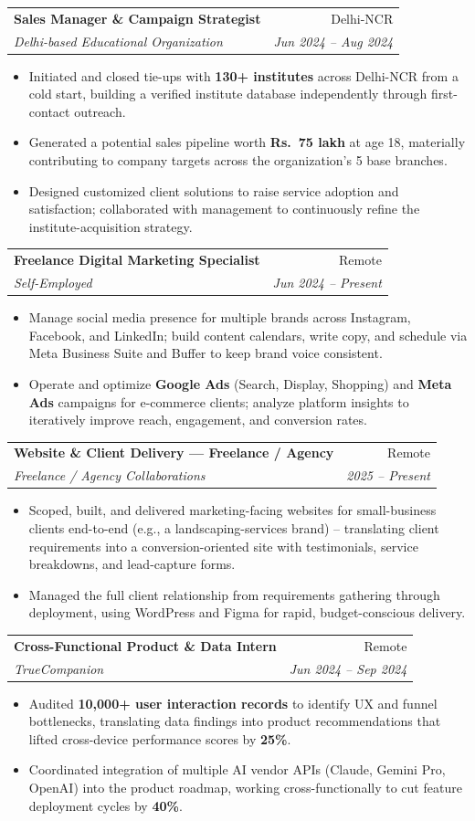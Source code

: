 \documentclass[letterpaper,10.5pt]{article}
\makeatletter
\newcommand{\resumeItem}[1]{
  \item\small{#1 \vspace{-2pt}}
}
\newcommand{\resumeSubheading}[4]{
  \vspace{-2pt}\item
    \begin{tabular*}{0.97\textwidth}[t]{l@{\extracolsep{\fill}}r}
      \textbf{#1} & \small #2 \\
      \textit{\small#3} & \textit{\small #4} \\
    \end{tabular*}\vspace{-5pt}
}
\newcommand{\resumeItemListStart}{\begin{itemize}[leftmargin=0.18in]}
\newcommand{\resumeItemListEnd}{\end{itemize}\vspace{-4pt}}
\makeatother
\begin{document}
  \resumeSubheading
    {Sales Manager \& Campaign Strategist}{Delhi-NCR}
    {Delhi-based Educational Organization}{Jun 2024 -- Aug 2024}
    \resumeItemListStart
      \resumeItem{Initiated and closed tie-ups with \textbf{130+ institutes} across Delhi-NCR from a cold start, building a verified institute database independently through first-contact outreach.}
      \resumeItem{Generated a potential sales pipeline worth \textbf{Rs.\ 75 lakh} at age 18, materially contributing to company targets across the organization's 5 base branches.}
      \resumeItem{Designed customized client solutions to raise service adoption and satisfaction; collaborated with management to continuously refine the institute-acquisition strategy.}
    \resumeItemListEnd

  \resumeSubheading
    {Freelance Digital Marketing Specialist}{Remote}
    {Self-Employed}{Jun 2024 -- Present}
    \resumeItemListStart
      \resumeItem{Manage social media presence for multiple brands across Instagram, Facebook, and LinkedIn; build content calendars, write copy, and schedule via Meta Business Suite and Buffer to keep brand voice consistent.}
      \resumeItem{Operate and optimize \textbf{Google Ads} (Search, Display, Shopping) and \textbf{Meta Ads} campaigns for e-commerce clients; analyze platform insights to iteratively improve reach, engagement, and conversion rates.}
    \resumeItemListEnd

  \resumeSubheading
    {Website \& Client Delivery --- Freelance / Agency}{Remote}
    {Freelance / Agency Collaborations}{2025 -- Present}
    \resumeItemListStart
      \resumeItem{Scoped, built, and delivered marketing-facing websites for small-business clients end-to-end (e.g., a landscaping-services brand) -- translating client requirements into a conversion-oriented site with testimonials, service breakdowns, and lead-capture forms.}
      \resumeItem{Managed the full client relationship from requirements gathering through deployment, using WordPress and Figma for rapid, budget-conscious delivery.}
    \resumeItemListEnd

  \resumeSubheading
    {Cross-Functional Product \& Data Intern}{Remote}
    {TrueCompanion}{Jun 2024 -- Sep 2024}
    \resumeItemListStart
      \resumeItem{Audited \textbf{10,000+ user interaction records} to identify UX and funnel bottlenecks, translating data findings into product recommendations that lifted cross-device performance scores by \textbf{25\%}.}
      \resumeItem{Coordinated integration of multiple AI vendor APIs (Claude, Gemini Pro, OpenAI) into the product roadmap, working cross-functionally to cut feature deployment cycles by \textbf{40\%}.}
    \resumeItemListEnd
\end{document}
